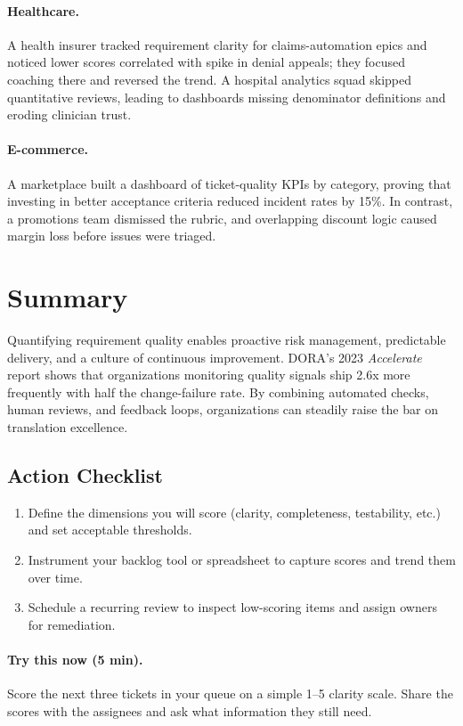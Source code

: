 \paragraph{Healthcare.} A health insurer tracked requirement clarity for claims-automation epics and noticed lower scores correlated with spike in denial appeals; they focused coaching there and reversed the trend. A hospital analytics squad skipped quantitative reviews, leading to dashboards missing denominator definitions and eroding clinician trust.

\paragraph{E-commerce.} A marketplace built a dashboard of ticket-quality KPIs by category, proving that investing in better acceptance criteria reduced incident rates by 15\%. In contrast, a promotions team dismissed the rubric, and overlapping discount logic caused margin loss before issues were triaged.

\section{Summary}
\label{sec:quality-summary}

Quantifying requirement quality enables proactive risk management, predictable delivery, and a culture of continuous improvement. DORA’s 2023 \textit{Accelerate} report shows that organizations monitoring quality signals ship 2.6x more frequently with half the change-failure rate. By combining automated checks, human reviews, and feedback loops, organizations can steadily raise the bar on translation excellence.

\subsection{Action Checklist}
\begin{enumerate}
    \item Define the dimensions you will score (clarity, completeness, testability, etc.) and set acceptable thresholds.
    \item Instrument your backlog tool or spreadsheet to capture scores and trend them over time.
    \item Schedule a recurring review to inspect low-scoring items and assign owners for remediation.
\end{enumerate}

\paragraph{Try this now (5 min).} Score the next three tickets in your queue on a simple 1–5 clarity scale. Share the scores with the assignees and ask what information they still need.

